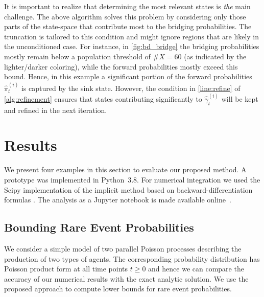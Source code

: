 It is important to realize that determining the most relevant states is \emph{the} main challenge.
The above algorithm solves this problem by considering only those parts of the state-space that contribute most to the bridging probabilities.
The truncation is tailored to this condition and might ignore regions that are likely in the unconditioned case.
For instance, in \autoref{fig:bd_bridge} the bridging probabilities mostly remain below a population threshold of $\#X=60$ (as indicated by the lighter/darker coloring), while the forward probabilities mostly exceed this bound. Hence, in this example a significant portion of the forward probabilities $\hat\pi_t^{(i)}$  
 is captured by the sink state. However, the condition in \autoref{line:refine} of \autoref{alg:refinement} ensures that
states contributing significantly to $\hat\gamma_t^{(i)}$ will be kept and refined in the next iteration.
 


\section{Results}\label{sec:bridging:results}
% 
We present four examples in this section to evaluate our proposed method. 
A prototype was implemented in Python~3.8. For numerical integration we used the Scipy implementation \cite{2020SciPy-NMeth} of the implicit method based on backward-differentiation formulas \cite{byrne1975polyalgorithm}.
The analysis as a Jupyter notebook is made available online~\cite{mjp_bridging}.

\subsection{Bounding Rare Event Probabilities}

We consider a simple model of two parallel Poisson processes describing the production of two 
types of agents. 
The corresponding probability distribution
has Poisson product form at all time points $t\geq 0$ and hence we can compare the accuracy of our  numerical results with the exact analytic solution.
We use the proposed approach to compute lower bounds for rare event probabilities.



